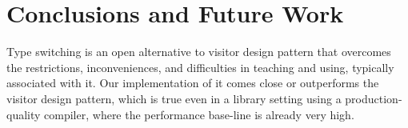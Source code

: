 \section{Conclusions and Future Work} %
\label{sec:cc}

Type switching is an open alternative to visitor design pattern that overcomes 
the restrictions, inconveniences, and difficulties in teaching and using, 
typically associated with it. Our implementation of it comes close or 
outperforms the visitor design pattern, which is true even in a library setting 
using a production-quality compiler, where the performance base-line is 
already very high.

%
%
%
%
%
